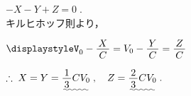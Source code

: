 \documentclass[../../../uem_phy_std_a.tex]{subfiles}
\begin{document}
\begin{enumerate}
            \myspaceb%
            $\displaystyle%
                -X - Y + Z = 0 \;.
            $\\
            キルヒホッフ則より，
            
            \myspaceb%
            $\displaystyle%
                V_0 - \myfraca{X}{C} = V_0 - \myfraca{Y}{C} = \myfraca{Z}{C}
            $

            \myspaceb%
            $\displaystyle%
                \therefore \; X = Y = \uwave{\myfraca{1}{3}CV_0} \;,%
                \quad Z = \uwave{\myfraca{2}{3}CV_0} \;.
            $
    \end{enumerate}
\end{document}
